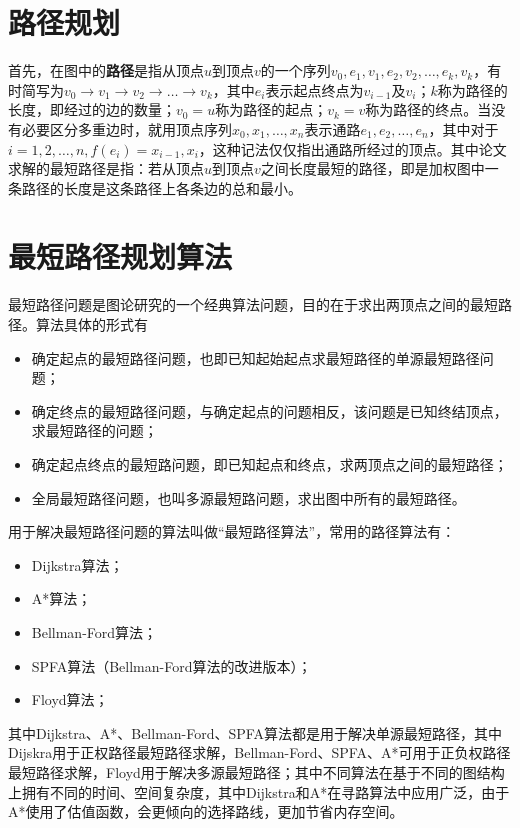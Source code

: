 \section{路径规划}
首先，在图中的\textbf{路径}是指从顶点$u$到顶点$v$的一个序列$v_0,e_1,v_1,e_2,v_2,\dots,e_k,v_k$，有时简写为$v_0\rightarrow v_1\rightarrow v_2\rightarrow\dots\rightarrow v_k$，其中$e_i$表示起点终点为$v_{i-1}$及$v_i$；$k$称为路径的长度，即经过的边的数量；$v_0=u$称为路径的起点；$v_k=v$称为路径的终点。当没有必要区分多重边时，就用顶点序列$x_0,x_1,\dots, x_n$表示通路$e_1,e_2,\dots,e_n$，其中对于$i=1,2,\dots,n,f(e_i)={x_{i-1}, x_i}$，这种记法仅仅指出通路所经过的顶点。其中论文求解的最短路径是指：若从顶点$u$到顶点$v$之间长度最短的路径，即是加权图中一条路径的长度是这条路径上各条边的总和最小。
\section{最短路径规划算法}
最短路径问题是图论研究的一个经典算法问题，目的在于求出两顶点之间的最短路径。算法具体的形式有
\begin{itemize}
    \item 确定起点的最短路径问题，也即已知起始起点求最短路径的单源最短路径问题；
    \item 确定终点的最短路径问题，与确定起点的问题相反，该问题是已知终结顶点，求最短路径的问题；
    \item 确定起点终点的最短路问题，即已知起点和终点，求两顶点之间的最短路径；
    \item 全局最短路径问题，也叫多源最短路问题，求出图中所有的最短路径。
\end{itemize}
\par 用于解决最短路径问题的算法叫做“最短路径算法”，常用的路径算法有：
\begin{itemize}
    \item Dijkstra算法；
    \item A*算法；
    \item Bellman-Ford算法；
    \item SPFA算法（Bellman-Ford算法的改进版本）；
    \item Floyd算法；
\end{itemize}
\par 其中Dijkstra、A*、Bellman-Ford、SPFA算法都是用于解决单源最短路径，其中Dijskra用于正权路径最短路径求解，Bellman-Ford、SPFA、A*可用于正负权路径最短路径求解，Floyd用于解决多源最短路径；其中不同算法在基于不同的图结构上拥有不同的时间、空间复杂度，其中Dijkstra和A*在寻路算法中应用广泛，由于A*使用了估值函数，会更倾向的选择路线，更加节省内存空间。
